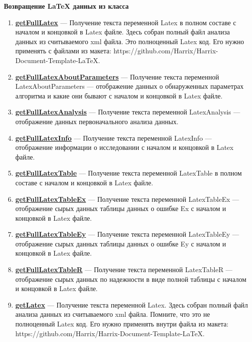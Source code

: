 \textbf{Возвращение LaTeX данных из класса}
\begin{enumerate}

\item \textbf{\hyperref[getFullLatex]{getFullLatex}} --- Получение текста переменной Latex в полном составе с началом и концовкой в Latex файле. Здесь собран полный файл анализа данных из считываемого xml файла. Это полноценный Latex код. Его нужно применять с файлами из макета: https://github.com/Harrix/Harrix-Document-Template-LaTeX.

\item \textbf{\hyperref[getFullLatexAboutParameters]{getFullLatexAboutParameters}} --- Получение текста переменной LatexAboutParameters --- отображение данных о обнаруженных параметрах алгоритма и какие они бывают с началом и концовкой в Latex файле.

\item \textbf{\hyperref[getFullLatexAnalysis]{getFullLatexAnalysis}} --- Получение текста переменной LatexAnalysis --- отображение данных первоначального анализа данных.

\item \textbf{\hyperref[getFullLatexInfo]{getFullLatexInfo}} --- Получение текста переменной LatexInfo --- отображение информации о исследовании с началом и концовкой в Latex файле.

\item \textbf{\hyperref[getFullLatexTable]{getFullLatexTable}} --- Получение текста переменной LatexTable в полном составе с началом и концовкой в Latex файле.

\item \textbf{\hyperref[getFullLatexTableEx]{getFullLatexTableEx}} --- Получение текста переменной LatexTableEx --- отображение сырых данных таблицы данных о ошибке Ex с началом и концовкой в Latex файле.

\item \textbf{\hyperref[getFullLatexTableEy]{getFullLatexTableEy}} --- Получение текста переменной LatexTableEy --- отображение сырых данных таблицы данных о ошибке Ey с началом и концовкой в Latex файле.

\item \textbf{\hyperref[getFullLatexTableR]{getFullLatexTableR}} --- Получение текста переменной LatexTableR --- отображение сырых данных по надежности в виде полной таблицы с началом и концовкой в Latex файле.

\item \textbf{\hyperref[getLatex]{getLatex}} --- Получение текста переменной Latex. Здесь собран полный файл анализа данных из считываемого xml файла. Помните, что это не полноценный Latex код. Его нужно применять внутри файла из макета: https://github.com/Harrix/Harrix-Document-Template-LaTeX.


\end{enumerate}
